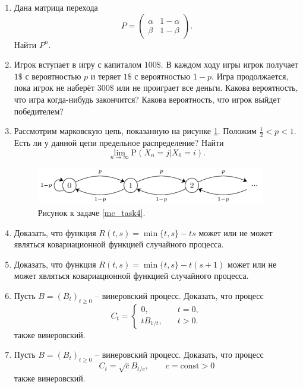 \documentclass[a4paper,12pt]{extreport}
\renewcommand{\=}[1]{\stackrel{#1}{=}} %
\newcommand{\Proba}{\mathrm{P}}
\newcommand{\generaltime}{t \geqslant 0}
\newcommand{\newprocess}[1]{
	\ensuremath{
		#1 = \left(#1 _t\right)_{\generaltime}
	}
}
\begin{document}
\begin{enumerate}
	\item Дана матрица перехода 
    \[
    P = \begin{pmatrix}
    \alpha & 1-\alpha\\
    \beta & 1 - \beta
    \end{pmatrix}.
    \]
	Найти $P^n$.

	\item Игрок вступает в игру с капиталом $100\$$. В каждом ходу игры игрок получает $1\$$ с вероятностью $p$ и теряет $1\$$ с вероятностью $1-p$. Игра продолжается, пока игрок не наберёт $300\$$ или не проиграет все деньги. Какова вероятность, что игра когда-нибудь закончится? Какова вероятность, что игрок выйдет победителем?

	\item \label{mc_task4} Рассмотрим марковскую цепь, показанную
	на рисунке \ref{fig:task2}. Положим $\frac{1}{2} < p < 1$.
	Есть ли у данной цепи предельное распределение? Найти
    \[
    \lim\limits_{n \to \infty} \Proba (X_n = j | X_0 = i).
    \]
    
    \begin{figure}[h!]
		\centering
		\includegraphics[width=10cm]{img/MC-diagram-inf-2}
		\caption{Рисунок к задаче \ref{mc_task4}.}
		\label{fig:task2}
	\end{figure}

	\item Доказать, что функция $R(t, s) = \min\{t, s\} - ts$
	 может или не может являться ковариационной функцией случайного процесса.

	\item Доказать, что функция $R(t, s) = \min\{t, s\} - t(s + 1)$
	 может или не может являться ковариационной функцией случайного процесса.

	\item Пусть $\newprocess{B}$ -- винеровский процесс. Доказать,
	что процесс
	\[
	C_t = 
		\begin{cases}
			0, \quad & t = 0, \\
			t B_{1/t}, \quad & t > 0.
		\end{cases}
	\]
	также винеровский.

	\item Пусть $\newprocess{B}$ -- винеровский процесс. Доказать,
	что процесс
	\[
	C_t = 
		\sqrt{c} B_{t/c}, \qquad c = \mathrm{const} > 0
	\]
	также винеровский.


\end{enumerate}
\end{document}
